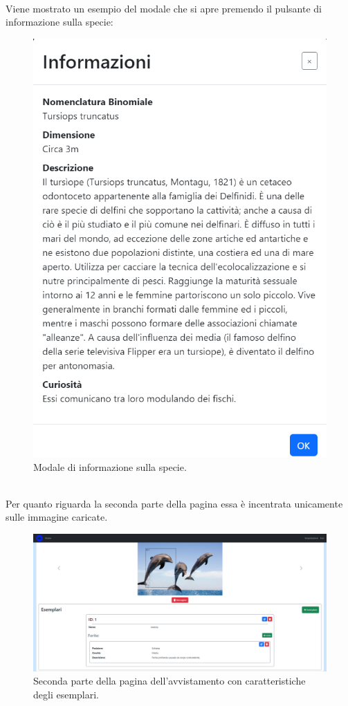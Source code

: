 \documentclass[a4paper,final,12pt]{report}
\begin{document}
\\ Viene mostrato un esempio del modale che si apre premendo il pulsante di informazione sulla specie:
\begin{figure}[hbtp]
\centering
\includegraphics[scale=0.40]{img_concettuale/info.png}
\caption{Modale di informazione sulla specie.}
\end{figure}
\\Per quanto riguarda la seconda parte della pagina essa è incentrata unicamente sulle immagine caricate.
\begin{figure}[hbtp]
\centering
\includegraphics[scale=0.31]{img_concettuale/avvistamentoPAG2.png}
\caption{Seconda parte della pagina dell'avvistamento con caratteristiche degli esemplari.}
\end{figure}
\end{document}
